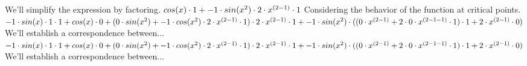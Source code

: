 \documentclass[a4paper, 12pt]{article}
\begin{document}
We'll simplify the expression by factoring.\newline
$ cos( x )  \cdot 1 + -1 \cdot  sin(  { x } ^ {\small 2 }  )  \cdot 2 \cdot  { x } ^ {\small  ( 2 - 1 )  }  \cdot 1$\newline
Considering the behavior of the function at critical points.\newline
$-1 \cdot  sin( x )  \cdot 1 \cdot 1 +  cos( x )  \cdot 0 +  ( 0 \cdot  sin(  { x } ^ {\small 2 }  )  + -1 \cdot  cos(  { x } ^ {\small 2 }  )  \cdot 2 \cdot  { x } ^ {\small  ( 2 - 1 )  }  \cdot 1 )  \cdot 2 \cdot  { x } ^ {\small  ( 2 - 1 )  }  \cdot 1 + -1 \cdot  sin(  { x } ^ {\small 2 }  )  \cdot  (  ( 0 \cdot  { x } ^ {\small  ( 2 - 1 )  }  + 2 \cdot 0 \cdot  { x } ^ {\small  ( 2 - 1 - 1 )  }  \cdot 1 )  \cdot 1 + 2 \cdot  { x } ^ {\small  ( 2 - 1 )  }  \cdot 0 ) $\newline
We'll establish a correspondence between...\newline
$-1 \cdot  sin( x )  \cdot 1 \cdot 1 +  cos( x )  \cdot 0 +  ( 0 \cdot  sin(  { x } ^ {\small 2 }  )  + -1 \cdot  cos(  { x } ^ {\small 2 }  )  \cdot 2 \cdot  { x } ^ {\small  ( 2 - 1 )  }  \cdot 1 )  \cdot 2 \cdot  { x } ^ {\small  ( 2 - 1 )  }  \cdot 1 + -1 \cdot  sin(  { x } ^ {\small 2 }  )  \cdot  (  ( 0 \cdot  { x } ^ {\small  ( 2 - 1 )  }  + 2 \cdot 0 \cdot  { x } ^ {\small  ( 2 - 1 - 1 )  }  \cdot 1 )  \cdot 1 + 2 \cdot  { x } ^ {\small  ( 2 - 1 )  }  \cdot 0 ) $\newline
We'll establish a correspondence between...\newline
\end{document}

